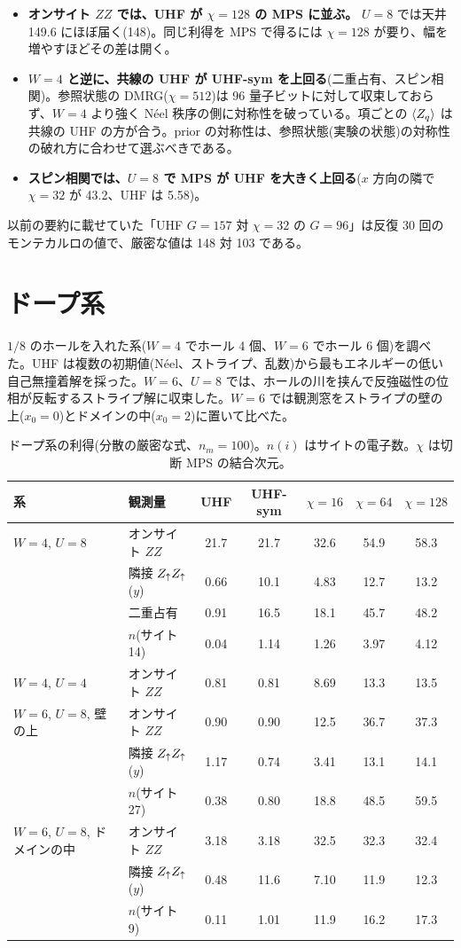 \begin{itemize}
  \item \textbf{オンサイト $ZZ$ では、UHF が $\chi=128$ の MPS に並ぶ。} $U=8$ では天井 149.6 にほぼ届く(148)。同じ利得を MPS で得るには $\chi=128$ が要り、幅を増やすほどその差は開く。
  \item \textbf{$W=4$ と逆に、共線の UHF が UHF-sym を上回る}(二重占有、スピン相関)。参照状態の DMRG($\chi=512$)は 96 量子ビットに対して収束しておらず、$W=4$ より強く Néel 秩序の側に対称性を破っている。項ごとの $\langle Z_q\rangle$ は共線の UHF の方が合う。prior の対称性は、参照状態(実験の状態)の対称性の破れ方に合わせて選ぶべきである。
  \item \textbf{スピン相関では、$U=8$ で MPS が UHF を大きく上回る}($x$ 方向の隣で $\chi=32$ が 43.2、UHF は 5.58)。
\end{itemize}

以前の要約に載せていた「UHF $G=157$ 対 $\chi=32$ の $G=96$」は反復 30 回のモンテカルロの値で、厳密な値は 148 対 103 である。

\section{ドープ系}
\label{sec:doped}

$1/8$ のホールを入れた系($W=4$ でホール 4 個、$W=6$ でホール 6 個)を調べた。UHF は複数の初期値(Néel、ストライプ、乱数)から最もエネルギーの低い自己無撞着解を採った。$W=6$、$U=8$ では、ホールの川を挟んで反強磁性の位相が反転するストライプ解に収束した。$W=6$ では観測窓をストライプの壁の上($x_0=0$)とドメインの中($x_0=2$)に置いて比べた。

\begin{table}[t]
\centering\small
\caption{ドープ系の利得(分散の厳密な式、$n_m=100$)。$n(i)$ はサイトの電子数。$\chi$ は切断 MPS の結合次元。}
\label{tab:doped}
\begin{tabular}{@{}llccccc@{}}
\toprule
系 & 観測量 & UHF & UHF-sym & $\chi{=}16$ & $\chi{=}64$ & $\chi{=}128$ \\
\midrule
$W=4$, $U=8$ & オンサイト $ZZ$ & 21.7 & 21.7 & 32.6 & 54.9 & 58.3 \\
 & 隣接 $Z_\uparrow Z_\uparrow$($y$) & 0.66 & 10.1 & 4.83 & 12.7 & 13.2 \\
 & 二重占有 & 0.91 & 16.5 & 18.1 & 45.7 & 48.2 \\
 & $n$(サイト 14) & 0.04 & 1.14 & 1.26 & 3.97 & 4.12 \\
$W=4$, $U=4$ & オンサイト $ZZ$ & 0.81 & 0.81 & 8.69 & 13.3 & 13.5 \\
$W=6$, $U=8$, 壁の上 & オンサイト $ZZ$ & 0.90 & 0.90 & 12.5 & 36.7 & 37.3 \\
 & 隣接 $Z_\uparrow Z_\uparrow$($y$) & 1.17 & 0.74 & 3.41 & 13.1 & 14.1 \\
 & $n$(サイト 27) & 0.38 & 0.80 & 18.8 & 48.5 & 59.5 \\
$W=6$, $U=8$, ドメインの中 & オンサイト $ZZ$ & 3.18 & 3.18 & 32.5 & 32.3 & 32.4 \\
 & 隣接 $Z_\uparrow Z_\uparrow$($y$) & 0.48 & 11.6 & 7.10 & 11.9 & 12.3 \\
 & $n$(サイト 9) & 0.11 & 1.01 & 11.9 & 16.2 & 17.3 \\
\bottomrule
\end{tabular}
\end{table}

